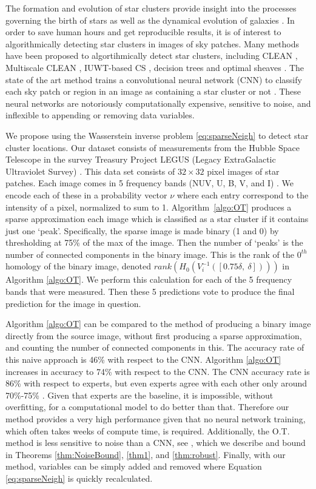 \documentclass[conference]{IEEEtran}
\begin{document}
The formation and evolution of star clusters provide insight into the processes governing the birth of stars as well as the dynamical evolution of galaxies \cite{perez}. 
In order to save human hours and get reproducible results, it is of interest to algorithmically detecting star clusters in images of sky patches. Many methods have been proposed to algortihmically detect star clusters, including CLEAN \cite{hogbom}, Multiscale CLEAN \cite{cornwell2008}, IUWT-based CS \cite{li}, decision trees \cite{grasha} and optimal sheaves \cite{robinson}. The state of the art method trains a convolutional neural network (CNN) to classify each sky patch or region in an image as containing a star cluster or not \cite{perez}. These neural networks are notoriously computationally expensive, sensitive to noise, and inflexible to appending or removing data variables. 

We propose using the Wasserstein inverse problem \eqref{eq:sparseNeigh} to detect star cluster locations. 
Our dataset consists of measurements from the Hubble Space Telescope in the survey Treasury Project LEGUS (Legacy ExtraGalactic Ultraviolet Survey) \cite{calzetti}. This data set consists of $32\times 32$ pixel images of star patches. Each image comes in 5 frequency bands (NUV, U, B, V, and I) \cite{calzetti}. We encode each of these in a probability vector $\nu$ where each entry correspond to the intensity of a pixel, normalized to sum to 1. Algorithm~\ref{algo:OT} produces a sparse approximation each image which is classified as a star cluster if it contains just one `peak'. Specifically, the sparse image is made binary (1 and 0) by thresholding at 75\% of the max of the image. Then the number of `peaks' is the number of connected components in the binary image. This is the rank of the $0^{th}$ homology of the binary image, denoted $rank(H_0(V_i^{-1}([0.75 \delta,\ \delta])))$ in Algorithm \ref{algo:OT}. We perform this calculation for each of the 5 frequency bands that were measured. 
Then these 5 predictions vote to produce the final prediction for the image in question. 

Algorithm \ref{algo:OT} can be compared to the method of producing a binary image directly from the source image, without first producing a sparse approximation, and counting the number of connected components in this. The accuracy rate of this naive approach is 46\% with respect to the CNN. Algorithm \ref{algo:OT} increases in accuracy to 74\% with respect to the CNN. The CNN accuracy rate is 86\% with respect to experts, but even experts agree with each other only around 70\%-75\% \cite{adamo, grasha, wei}. Given that experts are the baseline, it is impossible, without overfitting, for a computational model to do better than that. Therefore our method provides a very high performance given that no neural network training, which often takes weeks of compute time, is required. Additionally, the O.T. method is less sensitive to noise than a CNN, see \cite{zou}, which we describe and bound in Theorems \ref{thm:NoiseBound}, \ref{thm1}, and \ref{thm:robust}. Finally, with our method, variables can be simply added and removed where Equation \eqref{eq:sparseNeigh} is quickly recalculated. 
\end{document}
